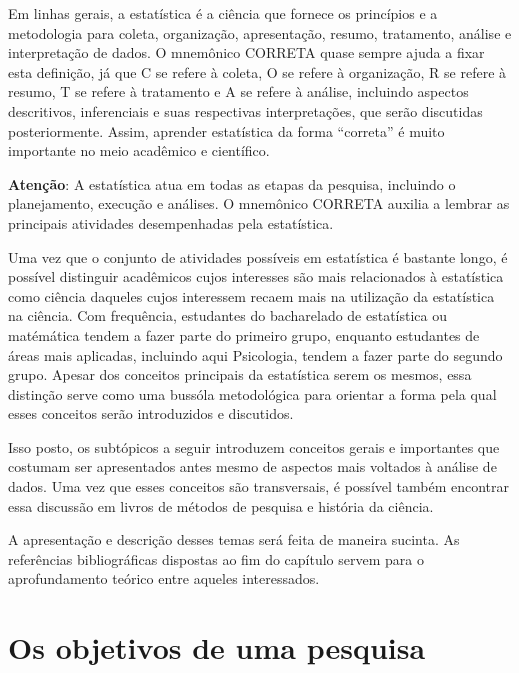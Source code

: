 \documentclass[
]{book}
\begin{document}
Em linhas gerais, a estatística é a ciência que fornece os princípios e a metodologia para coleta, organização, apresentação, resumo, tratamento, análise e interpretação de dados. O mnemônico CORRETA quase sempre ajuda a fixar esta definição, já que C se refere à coleta, O se refere à organização, R se refere à resumo, T se refere à tratamento e A se refere à análise, incluindo aspectos descritivos, inferenciais e suas respectivas interpretações, que serão discutidas posteriormente. Assim, aprender estatística da forma ``correta'' é muito importante no meio acadêmico e científico.

\begin{warning}

\textbf{Atenção}: A estatística atua em todas as etapas da pesquisa, incluindo o planejamento, execução e análises. O mnemônico CORRETA auxilia a lembrar as principais atividades desempenhadas pela estatística.

\end{warning}

Uma vez que o conjunto de atividades possíveis em estatística é bastante longo, é possível distinguir acadêmicos cujos interesses são mais relacionados à estatística como ciência daqueles cujos interessem recaem mais na utilização da estatística na ciência. Com frequência, estudantes do bacharelado de estatística ou matémática tendem a fazer parte do primeiro grupo, enquanto estudantes de áreas mais aplicadas, incluindo aqui Psicologia, tendem a fazer parte do segundo grupo. Apesar dos conceitos principais da estatística serem os mesmos, essa distinção serve como uma bussóla metodológica para orientar a forma pela qual esses conceitos serão introduzidos e discutidos.

Isso posto, os subtópicos a seguir introduzem conceitos gerais e importantes que costumam ser apresentados antes mesmo de aspectos mais voltados à análise de dados. Uma vez que esses conceitos são transversais, é possível também encontrar essa discussão em livros de métodos de pesquisa e história da ciência.

A apresentação e descrição desses temas será feita de maneira sucinta. As referências bibliográficas dispostas ao fim do capítulo servem para o aprofundamento teórico entre aqueles interessados.

\hypertarget{os-objetivos-de-uma-pesquisa}{%
\section{Os objetivos de uma pesquisa}\label{os-objetivos-de-uma-pesquisa}}
\end{document}
